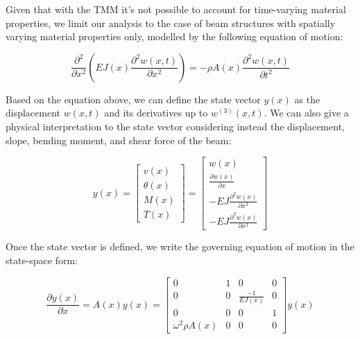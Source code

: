 Given that with the TMM it's not possible to account for time-varying material properties, we limit our analysis to the case of beam structures with spatially varying material properties only, modelled by the following equation of motion:

\begin{equation}
    \frac{\partial^2}{\partial x^2} \left( E J(x) \frac{\partial^2 w(x,t)}{\partial x^2} \right) = - \rho A(x) \frac{\partial^2 w(x,t)}{\partial t^2}
\end{equation}

Based on the equation above, we can define the state vector $y(x)$ as the displacement $w(x,t)$ and its derivatives up to $w^{(3)}(x,t)$.
We can also give a physical interpretation to the state vector considering instead the displacement, slope, bending moment, and shear force of the beam:

\begin{equation}
    y(x) =
    \begin{bmatrix}
        v(x)      \\
        \theta(x) \\
        M(x)      \\
        T(x)
    \end{bmatrix} =
    \begin{bmatrix}
        w(x)                                     \\
        \frac{\partial w(x)}{\partial x}         \\
        -EJ \frac{\partial^2 w(x)}{\partial x^2} \\
        -EJ \frac{\partial^3 w(x)}{\partial x^3}
    \end{bmatrix}
\end{equation}

Once the state vector is defined, we write the governing equation of motion in the state-space form:

\begin{equation}
    \frac{\partial y(x)}{\partial x} = A(x) y(x) =
    \begin{bmatrix}
        0                  & 1 & 0                & 0 \\
        0                  & 0 & \frac{-1}{EJ(x)} & 0 \\
        0                  & 0 & 0                & 1 \\
        \omega^2 \rho A(x) & 0 & 0                & 0
    \end{bmatrix} y(x)
\end{equation}

